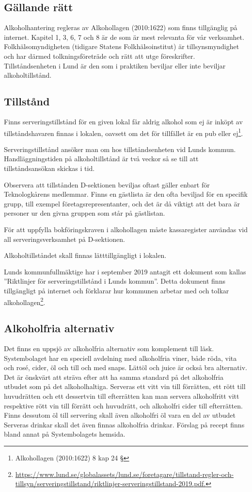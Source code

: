 \documentclass[]{dsekkallelse}
\begin{document}
\subsection{Gällande rätt}
Alkoholhantering regleras av Alkohollagen (2010:1622) som finns tillgänglig på internet.
Kapitel 1, 3, 6, 7 och 8 är de som är mest relevanta för vår verksamhet. Folkhälsomyndigheten (tidigare Statens Folkhälsoinstitut) är tillsynsmyndighet och har därmed tolkningsföreträde och rätt att utge föreskrifter. Tillståndsenheten i Lund är den som i praktiken beviljar eller inte beviljar alkoholtillstånd.

\subsection{Tillstånd}
Finns serveringstillstånd för en given lokal får aldrig alkohol som ej är inköpt av tillståndshavaren finnas i lokalen, oavsett om det för tillfället är en pub eller ej\footnote{Alkohollagen (2010:1622) 8 kap 24 §}.

Serveringstillstånd ansöker man om hos tillståndsenheten vid Lunds kommun. Handläggningstiden på alkoholtillstånd är två veckor så se till att tillståndsansökan skickas i tid.

Observera att tillstånden D-sektionen beviljas oftast gäller enbart för Teknologkårens medlemmar. Finns en gästlista är den ofta beviljad för en specifik grupp, till exempel företagsrepresentanter, och det är då viktigt att det bara är personer ur den givna gruppen som står på gästlistan.

För att uppfylla bokföringskraven i alkohollagen måste kassaregister användas vid all
serveringsverksamhet på D-sektionen.

Alkoholtillståndet skall finnas lätttillgängligt i lokalen.

Lunds kommunfullmäktige har i september 2019 antagit ett dokument som kallas ''Riktlinjer för serveringstillstånd i Lunds kommun''. Detta dokument finns tillgängligt på internet och förklarar hur kommunen arbetar med och tolkar alkohollagen\footnote{\url{https://www.lund.se/globalassets/lund.se/foretagare/tillstand-regler-och-
        tillsyn/serveringstillstand/riktlinjer-serveringstillstand-2019.pdf.}
}.

\subsection{Alkoholfria alternativ}
Det finns en uppsjö av alkoholfria alternativ som komplement till läsk. Systembolaget har en speciell avdelning med alkoholfria viner, både röda, vita och rosé, cider, öl och till och med snaps. Lättöl och juice är också bra alternativ. Det är önskvärt att sträva efter att ha samma standard på det alkoholfria utbudet som på det alkoholhaltiga. Serveras ett vitt vin till förrätten, ett rött till huvudrätten och ett dessertvin till efterrätten kan man servera alkoholfritt vitt respektive rött vin till förrätt och huvudrätt, och alkoholfri cider till efterrätten. Finns dessutom öl till servering skall även alkoholfri öl vara en del av utbudet
Serveras drinkar skall det även finnas alkoholfria drinkar. Förslag på recept finns bland annat
på Systembolagets hemsida.
\end{document}
